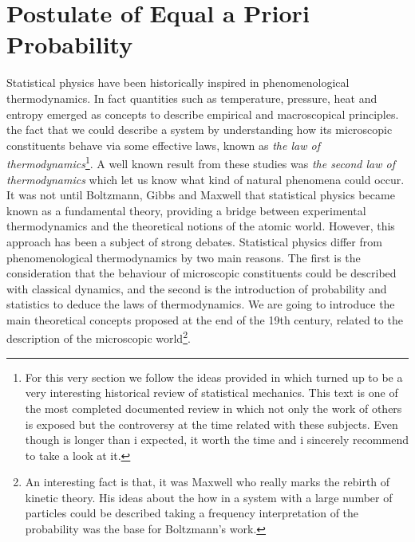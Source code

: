 \section{Postulate of Equal a Priori Probability}
Statistical physics have been historically inspired in phenomenological thermodynamics. In fact quantities such as temperature, pressure, heat and entropy emerged as concepts to describe empirical and macroscopical principles. the fact that we could describe a system by understanding how its microscopic constituents behave via some effective laws, known as \textit{the law of thermodynamics\cite{uffink_handbook_2007}}\footnote{For this very section we follow the ideas provided in \cite{uffink_handbook_2007} which turned up to be a very interesting historical review of statistical mechanics. This text is one of the most completed documented review in which not only the work of others is exposed but the controversy at the time related with these subjects. Even though is longer than i expected, it worth the time and i sincerely recommend to take a look at it.}. A well known result from these studies was \textit{the second law of thermodynamics} which let us know what kind of natural phenomena could occur.
\newline
It was not until Boltzmann, Gibbs and Maxwell that statistical physics became known as a fundamental theory, providing a bridge between experimental thermodynamics and the theoretical notions of the atomic world. However, this approach has been a subject of strong debates. Statistical physics differ from phenomenological thermodynamics by two main reasons. The first is the consideration that the behaviour of microscopic constituents could be described with classical dynamics, and the second is the introduction of probability and statistics to deduce the laws of thermodynamics.
\newline
We are going to introduce the main theoretical concepts proposed at the end of the 19th century,  related to the description of the microscopic world\footnote{An interesting fact is that, it was Maxwell who really marks the rebirth of kinetic theory. His ideas about the how in a system with a large number of particles could be described taking a frequency interpretation of the probability was the base for Boltzmann's work.}. 
\newline
